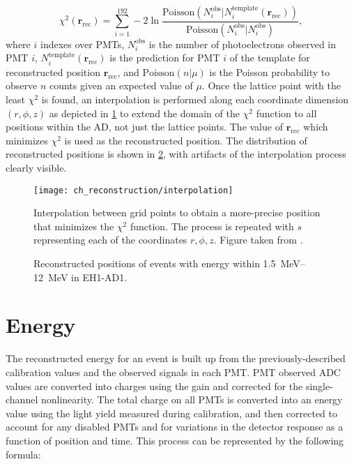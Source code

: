 \begin{equation}
    \chi^2(\textbf{r}_{\text{rec}}) = \sum_{i=1}^{192} -2\ln\frac{
        \text{Poisson}(N_i^{\text{obs}} \vert N_i^{\text{template}}(\textbf{r}_{\text{rec}}))
    }
    {
        \text{Poisson}(N_i^{\text{obs}} \vert N_i^{\text{obs}})
    },
\end{equation}
where $i$ indexes over PMTs,
$N_i^{\text{obs}}$ is the number of photoelectrons observed in PMT $i$,
$N_{i}^{\text{template}}(\textbf{r}_{\text{rec}})$ is the prediction
for PMT $i$ of the template for reconstructed position $\textbf{r}_{\text{rec}}$,
and $\text{Poisson}(n\vert\mu)$ is the Poisson probability
to observe $n$ counts given an expected value of $\mu$.
Once the lattice point with the least $\chi^2$ is found,
an interpolation is performed along each coordinate dimension $(r, \phi, z)$
as depicted in \cref{fig:interpolation}
to extend the domain of the $\chi^2$ function to all positions within the AD,
not just the lattice points.
The value of $\textbf{r}_{\text{rec}}$ which minimizes $\chi^2$
is used as the reconstructed position.
The distribution of reconstructed positions is shown in \cref{fig:position_map},
with artifacts of the interpolation process clearly visible.


\begin{figure}
    \centering
    \texttt{[image: ch\_reconstruction/interpolation]}
    \caption{
        Interpolation between grid points to obtain a more-precise position
        that minimizes the $\chi^2$ function.
        The process is repeated with $s$ representing each of the coordinates
        $r, \phi, z$.
        Figure taken from \cite{adsimple1}.
    }
    \label{fig:interpolation}
\end{figure}

\begin{figure}
    \caption{
        Reconstructed positions of events with energy within \SIrange{1.5}{12}{\MeV}
        in EH1-AD1.
    }
    \label{fig:position_map}
\end{figure}

\section{Energy}
\label{sec:reco_energy}

The reconstructed energy for an event is built up from the previously-described
calibration values and the observed signals in each PMT.
PMT observed ADC values are converted into charges using the gain
and corrected for the single-channel nonlinearity.
The total charge on all PMTs is converted into an energy value
using the light yield measured during calibration,
and then corrected to account for any disabled PMTs
and for variations in the detector response as a function of position and time.
This process can be represented by the following formula:

